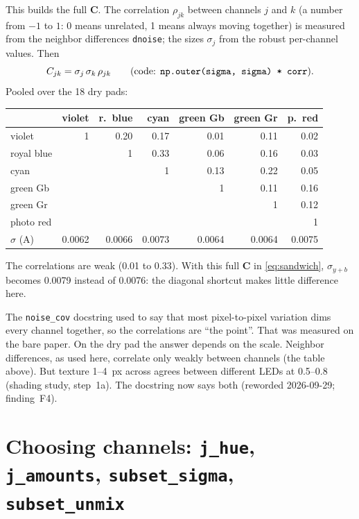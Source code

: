 \documentclass[11pt,letterpaper]{article}
\newcommand{\code}[1]{\texttt{#1}}
\newcommand{\mC}{\mathbf{C}}
\newcommand{\src}[3]{%
  }
\begin{document}
\src{506}{512}{The body of \code{noise\_cov}.}

This builds the full $\mC$.  The correlation $\rho_{jk}$ between channels $j$
and $k$ (a number from $-1$ to $1$: 0 means unrelated, 1 means always moving
together) is measured from the neighbor differences \code{dnoise}; the
sizes $\sigma_j$ from the robust per-channel values.  Then
\[
C_{jk} = \sigma_j\,\sigma_k\,\rho_{jk}
\qquad\text{(code: \code{np.outer(sigma, sigma) * corr})}.
\]
Pooled over the 18 dry pads:
\begin{center}\small
\begin{tabular}{@{}lrrrrrr@{}}
\toprule
 & violet & r.\ blue & cyan & green Gb & green Gr & p.\ red \\
\midrule
violet    & 1 & 0.20 & 0.17 & 0.01 & 0.11 & 0.02 \\
royal blue&   & 1    & 0.33 & 0.06 & 0.16 & 0.03 \\
cyan      &   &      & 1    & 0.13 & 0.22 & 0.05 \\
green Gb  &   &      &      & 1    & 0.11 & 0.16 \\
green Gr  &   &      &      &      & 1    & 0.12 \\
photo red &   &      &      &      &      & 1    \\
\midrule
$\sigma$ (A) & 0.0062 & 0.0066 & 0.0073 & 0.0064 & 0.0064 & 0.0075 \\
\bottomrule
\end{tabular}
\end{center}
The correlations are weak (0.01 to 0.33).  With this full $\mC$ in
\eqref{eq:sandwich}, $\sigma_{y+b}$ becomes 0.0079 instead of 0.0076: the
diagonal shortcut makes little difference here.

The \code{noise\_cov} docstring used to say that most pixel-to-pixel
variation dims every channel together, so the correlations are ``the
point''.  That was measured on the bare paper.  On the dry pad the answer
depends on the scale.  Neighbor differences, as used here, correlate only
weakly between channels (the table above).  But texture 1--4~px across
agrees between different LEDs at 0.5--0.8 (shading study, step~1a).  The
docstring now says both (reworded 2026-09-29; finding~F4).

\section{Choosing channels: \code{j\_hue}, \code{j\_amounts},
\code{subset\_sigma}, \code{subset\_unmix}}
\label{sec:subsets}
\end{document}
